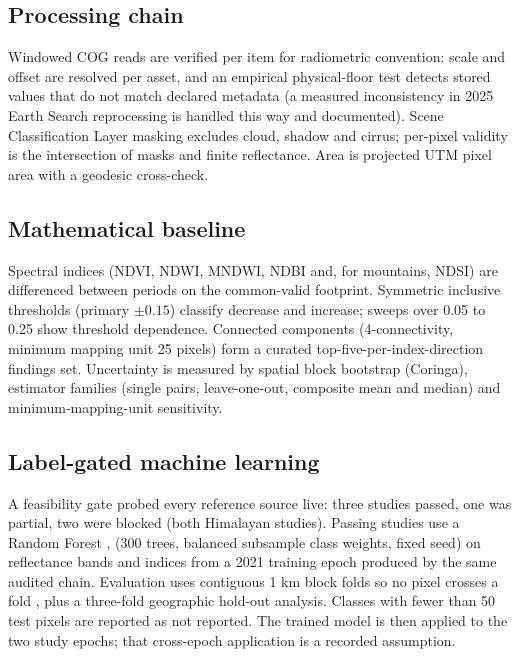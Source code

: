 \documentclass[11pt]{article}
\begin{document}
\subsection{Processing chain}

Windowed COG reads are verified per item for radiometric convention: scale and offset are resolved per asset, and an empirical physical-floor test detects stored values that do not match declared metadata (a measured inconsistency in 2025 Earth Search reprocessing is handled this way and documented). Scene Classification Layer masking excludes cloud, shadow and cirrus; per-pixel validity is the intersection of masks and finite reflectance. Area is projected UTM pixel area with a geodesic cross-check.

\subsection{Mathematical baseline}

Spectral indices (NDVI, NDWI, MNDWI, NDBI and, for mountains, NDSI) are differenced between periods on the common-valid footprint. Symmetric inclusive thresholds (primary $\pm 0.15$) classify decrease and increase; sweeps over 0.05 to 0.25 show threshold dependence. Connected components (4-connectivity, minimum mapping unit 25 pixels) form a curated top-five-per-index-direction findings set. Uncertainty is measured by spatial block bootstrap (Coringa), estimator families (single pairs, leave-one-out, composite mean and median) and minimum-mapping-unit sensitivity.

\subsection{Label-gated machine learning}

A feasibility gate probed every reference source live: three studies passed, one was partial, two were blocked (both Himalayan studies). Passing studies use a Random Forest \cite{breiman2001}, \cite{pedregosa2011} (300 trees, balanced subsample class weights, fixed seed) on reflectance bands and indices from a 2021 training epoch produced by the same audited chain. Evaluation uses contiguous 1 km block folds so no pixel crosses a fold \cite{roberts2017}, plus a three-fold geographic hold-out analysis. Classes with fewer than 50 test pixels are reported as not reported. The trained model is then applied to the two study epochs; that cross-epoch application is a recorded assumption.
\end{document}
